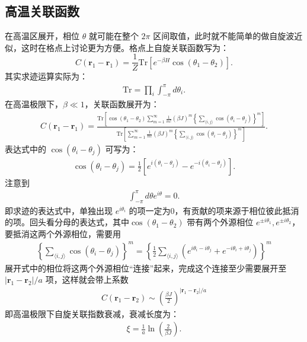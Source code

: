 \documentclass[10pt,UTF8]{ctexart}
\begin{document}
\subsection*{高温关联函数}
\noindent
在高温区展开，相位 $\theta$ 就可能在整个 $2 \pi$ 区间取值，此时就不能简单的做自旋波近似，这时在格点上讨论更为方便。格点上自旋关联函数写为：
\begin{equation}
	C(\bm r_1 - \bm r_1) = \frac{1}{Z} \mathrm{Tr}\left[e^{-\beta H}\cos(\theta_1-\theta_2)\right].
\end{equation}
其实求迹运算实际为：
\begin{eqnarray}
	\mathrm{Tr} = \prod_i \int_{-\pi}^{\pi} d\theta_i.
\end{eqnarray}
在高温极限下，$\beta \ll 1$，关联函数展开为：
\begin{eqnarray}
	C(\bm r_1 - \bm r_1) = \frac{\mathrm{Tr} \left[ \cos(\theta_1-\theta_2)\sum_{m=1}^{\infty}\frac{1}{m!}(\beta J)^m\left\{\sum_{\langle i,j \rangle}\cos(\theta_i-\theta_j) \right\}^m \right]}{\mathrm{Tr} \left[\sum_{m=1}^{\infty}\frac{1}{m!}(\beta J)^m\left\{\sum_{\langle i,j \rangle}\cos(\theta_i-\theta_j) \right\}^m \right]}.
\end{eqnarray}
表达式中的 $\cos(\theta_i-\theta_j)$ 可写为：
\begin{eqnarray}
	\cos(\theta_i-\theta_j) = \frac{1}{2}\left[e^{i(\theta_i-\theta_j)}-e^{-i(\theta_i-\theta_j)}\right].
\end{eqnarray}
注意到
\begin{eqnarray}
	\int_{-\pi}^{\pi} d\theta e^{i\theta} = 0.
\end{eqnarray}
即求迹的表达式中，单独出现 $e^{i\theta_i}$ 的项一定为0，有贡献的项来源于相位彼此抵消的项。回头看分母的表达式，其中$\cos(\theta_1-\theta_2)$ 带有两个外源相位 $e^{\pm i\theta_1}, e^{\pm i \theta_2}$，要抵消这两个外源相位，需要用
\begin{eqnarray}
	\left\{\sum_{\langle i,j \rangle}\cos(\theta_i-\theta_j) \right\}^m
	= \left\{\frac{1}{2}\sum_{\langle i,j \rangle}\left(e^{i\theta_i-i\theta_j}+e^{-i\theta_i+i\theta_j}\right) \right\}^m
\end{eqnarray}
展开式中的相位将这两个外源相位“连接”起来，完成这个连接至少需要展开至 $|\bm r_1-\bm r_2|/a$ 项，这样就会带上系数
\begin{eqnarray}
	C(\bm r_1-\bm r_2) \sim \left(\frac{\beta J}{2}\right)^{|\bm r_1-\bm r_2|/a}
\end{eqnarray}
即高温极限下自旋关联指数衰减，衰减长度为：
\begin{eqnarray}
	\xi = \frac{1}{a}\ln\left(\frac{2}{\beta J}\right).
\end{eqnarray}
\end{document}
